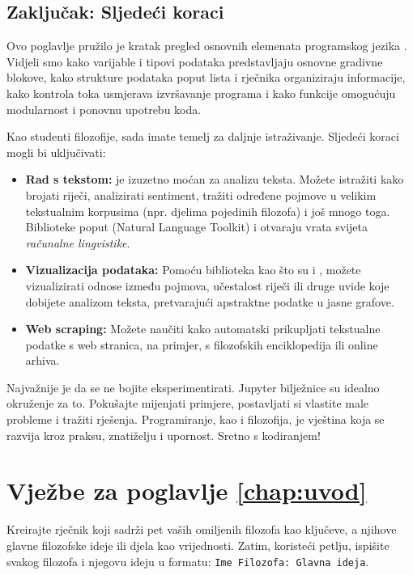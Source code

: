 \section{Zaključak: Sljedeći koraci}
\label{sec:zakljucak}

Ovo poglavlje pružilo je kratak pregled osnovnih elemenata programskog jezika . Vidjeli smo kako varijable i tipovi podataka predstavljaju osnovne gradivne blokove, kako strukture podataka poput lista i rječnika organiziraju informacije, kako kontrola toka usmjerava izvršavanje programa i kako funkcije omogućuju modularnost i ponovnu upotrebu koda.

Kao studenti filozofije, sada imate temelj za daljnje istraživanje. Sljedeći koraci mogli bi uključivati:
\begin{itemize}
    \item \textbf{Rad s tekstom:}  je izuzetno moćan za analizu teksta. Možete istražiti kako brojati riječi, analizirati sentiment, tražiti određene pojmove u velikim tekstualnim korpusima (npr. djelima pojedinih filozofa) i još mnogo toga. Biblioteke poput  (Natural Language Toolkit) i  otvaraju vrata svijeta \textit{računalne lingvistike}.
    \item \textbf{Vizualizacija podataka:} Pomoću biblioteka kao što su  i , možete vizualizirati odnose između pojmova, učestalost riječi ili druge uvide koje dobijete analizom teksta, pretvarajući apstraktne podatke u jasne grafove.
    \item \textbf{Web scraping:} Možete naučiti kako automatski prikupljati tekstualne podatke s web stranica, na primjer, s filozofskih enciklopedija ili online arhiva.
\end{itemize}

Najvažnije je da se ne bojite eksperimentirati. Jupyter bilježnice su idealno okruženje za to. Pokušajte mijenjati primjere, postavljati si vlastite male probleme i tražiti rješenja. Programiranje, kao i filozofija, je vještina koja se razvija kroz praksu, znatiželju i upornost. Sretno s kodiranjem!

\chapter*{Vježbe za poglavlje \ref{chap:uvod}}

\begin{vježba}
    Kreirajte rječnik koji sadrži pet vaših omiljenih filozofa kao ključeve, a njihove glavne filozofske ideje ili djela kao vrijednosti. Zatim, koristeći  petlju, ispišite svakog filozofa i njegovu ideju u formatu: \texttt{Ime Filozofa: Glavna ideja}.
\end{vježba}

